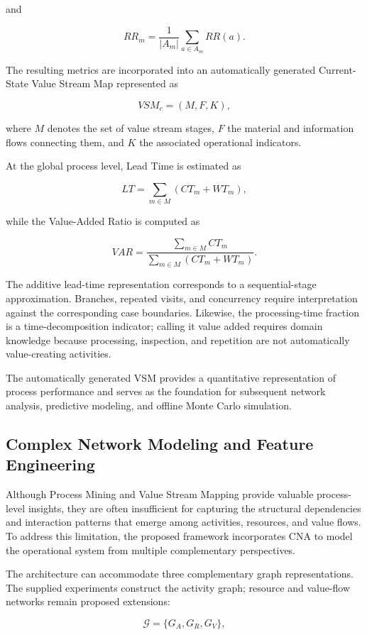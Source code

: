 \documentclass[pdflatex,iicol,Numbered,sn-basic]{sn-jnl}
\begin{document}
and

\[
RR_m
=
\frac{1}{|A_m|}
\sum_{a\in A_m}
RR(a).
\]

The resulting metrics are incorporated into an automatically generated Current-State Value Stream Map represented as

\[
VSM_c=(M,F,K),
\]

where \(M\) denotes the set of value stream stages, \(F\) the material and information flows connecting them, and \(K\) the associated operational indicators.

At the global process level, Lead Time is estimated as

\[
LT
=
\sum_{m\in M}
(CT_m+WT_m),
\]

while the Value-Added Ratio is computed as

\[
VAR
=
\frac{
\sum_{m\in M} CT_m
}{
\sum_{m\in M}(CT_m+WT_m)
}.
\]

The additive lead-time representation corresponds to a sequential-stage approximation. Branches, repeated visits, and concurrency require interpretation against the corresponding case boundaries. Likewise, the processing-time fraction is a time-decomposition indicator; calling it value added requires domain knowledge because processing, inspection, and repetition are not automatically value-creating activities.

The automatically generated VSM provides a quantitative representation of process performance and serves as the foundation for subsequent network analysis, predictive modeling, and offline Monte Carlo simulation.

\subsection{Complex Network Modeling and Feature Engineering}
\label{subsec:complex_networks}

Although Process Mining and Value Stream Mapping provide valuable process-level insights, they are often insufficient for capturing the structural dependencies and interaction patterns that emerge among activities, resources, and value flows. To address this limitation, the proposed framework incorporates CNA to model the operational system from multiple complementary perspectives.

The architecture can accommodate three complementary graph representations. The supplied experiments construct the activity graph; resource and value-flow networks remain proposed extensions:

\[
\mathcal{G}
=
\{
G_A,
G_R,
G_V
\},
\]
\end{document}

